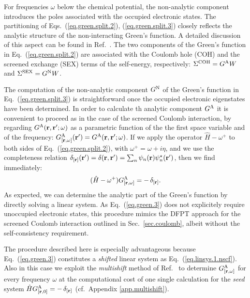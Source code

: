 \documentclass[twocolumn,prb,showpacs,superscriptaddress]{revtex4}
\def\w{\omega}
\def\H{\hat{H}}
\def\r{{\bf r}}
\def\rp{{\bf r^\prime}}
\begin{document}
For frequencies $\w$
below the chemical potential, the non-analytic component introduces the poles associated with the occupied 
electronic states. 
The partitioning of Eqs.\ (\ref{eq.green.split.2}),
(\ref{eq.green.split.3}) closely reflects the analytic structure
of the non-interacting Green's function.
A detailed discussion of this aspect can be found in Ref.\ .
The two components of the Green's function in Eq.\ (\ref{eq.green.split.2}) 
are associated with the Coulomb hole (COH) and the screened exchange (SEX) terms of the
self-energy, respectively:\cite{hl86} 
$\Sigma^{\rm COH} = G^{\rm A} W$  and $\Sigma^{\rm SEX} = G^{\rm N} W$.

The computation of the non-analytic component $G^{\rm N}$ of the
Green's function in Eq.\ (\ref{eq.green.split.3}) is straightforward 
once the occupied electronic eigenstates have been determined.
In order to calculate th analytic component $G^{\rm A}$ it is convenient to
proceed as in the case of the screened Coulomb interaction,
by regarding $G^{\rm A}(\r,\rp;\w)$ as a parametric
function of the the first space variable and of the frequency:
$G^{\rm A}_{[\r,\w]}(\rp) = G^{\rm A}(\r,\rp;\w)$.
If we apply the operator $\H-\w^+$ to both sides of Eq.\ (\ref{eq.green.split.2}),
with $\w^+=\w+i\eta$,
and we use the completeness relation $\delta_{[\r]}(\rp) = \delta(\r,\rp) = \sum_n \psi_n(\r)\psi_n^\star(\rp)$, then we find immediately:
  \begin{equation}\label{eq.green.3}
  (\H-\w^+) G^{\rm A}_{[\r,\w]} = -\, \delta_{[\r]}.
  \end{equation}
As expected, we can determine the analytic part of the Green's function
by directly solving a linear system. As Eq.\ (\ref{eq.green.3}) 
does not explicitely require unoccupied electronic states, this procedure mimics 
the DFPT approach for the screened Coulomb interaction outlined in Sec.~\ref{sec.coulomb},
albeit without the self-consistency requirement.

The procedure described here is especially advantageous because Eq.\ (\ref{eq.green.3})
constitutes a {\it shifted} linear system as Eq.\ (\ref{eq.linsys.1.nscf}).
Also in this case we exploit the {\it multishift} method of Ref.\ 
to determine $G^{\rm A}_{[\r,\w]}$ for every frequency $\w$
at the computational cost of one single calculation for the {\it seed} system $\H G^{\rm A}_{[\r,0]} = -\, \delta_{[\r]}$
(cf.\ Appendix \ref{app.multishift}).
\end{document}
